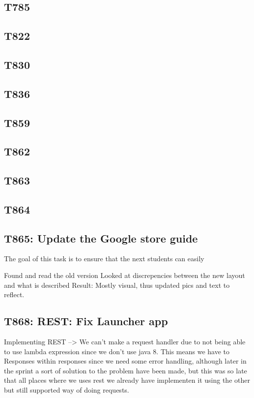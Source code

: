\subsection{T785}

\subsection{T822}

\subsection{T830}

\subsection{T836}

\subsection{T859}

\subsection{T862}

\subsection{T863}

\subsection{T864}

\subsection{T865: Update the Google store guide}


The goal of this task is to ensure that the next students can easily 


Found and read the old version
Looked at discrepencies between the new layout and what is described
Result: Mostly visual, thus updated pics and text to reflect.

\subsection{T868: REST: Fix Launcher app}
Implementing REST --> We can't make a request handler due to not being able
to use lambda expression since we don't use java 8.
This means we have to Responses within responses since we need some error
handling, although later in the sprint a sort of solution to the problem have
been made, but this was so late that all places where we uses rest we already
have implementen it using the other but still supported way of doing requests.

